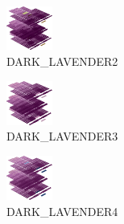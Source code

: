 \hspace{0.1cm}
\begin{minipage}[b]{0.15\linewidth}
\begin{figure}[H]                                                          
  \centering                                                             
  \begin{adjustbox}{width=1.5cm,center}                                   
  \includegraphics[width=1.5cm]{src/colorspace_colourflow/flows/colourflow_82-45.png}%
  \end{adjustbox}                                                        
\caption*{DARK\_LAVENDER2}                                           
\end{figure}                                                               
\end{minipage}
\hspace{0.1cm}
\begin{minipage}[b]{0.15\linewidth}
\begin{figure}[H]                                                          
  \centering                                                             
  \begin{adjustbox}{width=1.5cm,center}                                   
  \includegraphics[width=1.5cm]{src/colorspace_colourflow/flows/colourflow_83-45.png}%
  \end{adjustbox}                                                        
\caption*{DARK\_LAVENDER3}                                           
\end{figure}                                                               
\end{minipage}
\hspace{0.1cm}
\begin{minipage}[b]{0.15\linewidth}
\begin{figure}[H]                                                          
  \centering                                                             
  \begin{adjustbox}{width=1.5cm,center}                                   
  \includegraphics[width=1.5cm]{src/colorspace_colourflow/flows/colourflow_84-45.png}%
  \end{adjustbox}                                                        
\caption*{DARK\_LAVENDER4}                                           
\end{figure}                                                               
\end{minipage}
